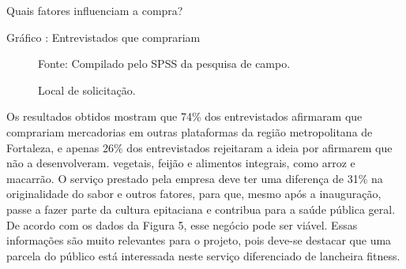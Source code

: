 \begin{commentA}
Quais fatores influenciam a compra?
\par \end{commentA}

\begin{commentB}
Gráfico : Entrevistados que comprariam
\par \end{commentB}

\vspace*{0.3cm}
\begin{figure}[!htbp]
\centering
\begin{footnotesize}
\captionsetup{textfont=bf, labelfont=bf, font=footnotesize, justification=centering}
	\caption {Local de solicitação.} \label{tab:Local de solicitação} 
	\vspace*{-0.3cm}
\vspace*{-0.3cm}
\par
Fonte: Compilado pelo SPSS da pesquisa de campo.
\end{footnotesize}
\end{figure}
\par

Os resultados obtidos mostram que 74\% dos entrevistados afirmaram que comprariam mercadorias em outras plataformas da região metropolitana de Fortaleza, e apenas 26\% dos entrevistados rejeitaram a ideia por afirmarem que não a desenvolveram. vegetais, feijão e alimentos integrais, como arroz e macarrão. O serviço prestado pela empresa deve ter uma diferença de 31\% na originalidade do sabor e outros fatores, para que, mesmo após a inauguração, passe a fazer parte da cultura epitaciana e contribua para a saúde pública geral. De acordo com os dados da Figura 5, esse negócio pode ser viável. Essas informações são muito relevantes para o projeto, pois deve-se destacar que uma parcela do público está interessada neste serviço diferenciado de lancheira fitness.

\begin{commentA} \vspace{0.3cm} \noindent * \par \vspace{0.1cm} \end{commentA}

